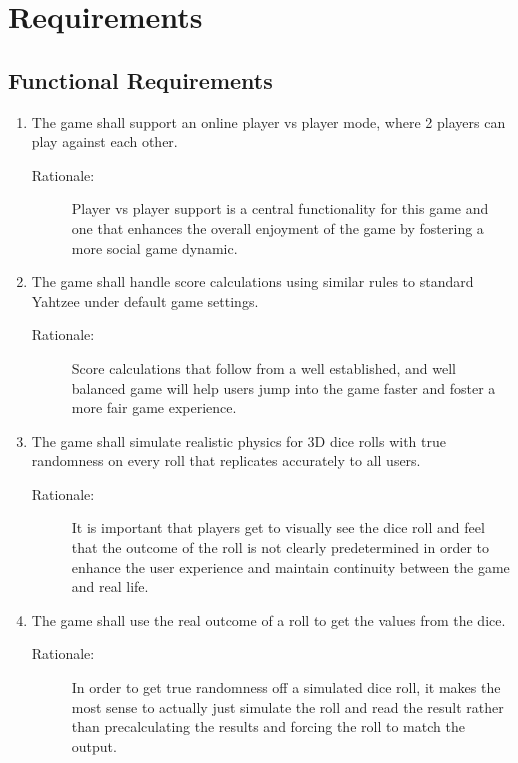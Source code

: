 \section{Requirements}

\subsection{Functional Requirements}

\begin{enumerate}[label=R\arabic*, start=1, left=0pt]

    \item The game shall support an online player vs player mode, where 2 players can play against each other.
    \begin{description}
        \item[Rationale:] Player vs player support is a central functionality for this game and one that enhances the overall enjoyment of the game by fostering a more social game dynamic.
    \end{description}

    \item The game shall handle score calculations using similar rules to standard Yahtzee under default game settings.
    \begin{description}
        \item[Rationale:] Score calculations that follow from a well established, and well balanced game will help users jump into the game faster and foster a more fair game experience.
    \end{description}

    \item The game shall simulate realistic physics for 3D dice rolls with true randomness on every roll that replicates accurately to all users.
    \begin{description}
        \item[Rationale:] It is important that players get to visually see the dice roll and feel that the outcome of the roll is not clearly predetermined in order to enhance the user experience and maintain continuity between the game and real life.
    \end{description}

    \item The game shall use the real outcome of a roll to get the values from the dice.
    \begin{description}
        \item[Rationale:] In order to get true randomness off a simulated dice roll, it makes the most sense to actually just simulate the roll and read the result rather than precalculating the results and forcing the roll to match the output.
    \end{description}


\end{enumerate}
